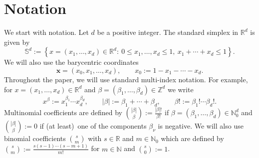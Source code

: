 \documentclass[12pt,reqno]{article}
\begin{document}
\section{Notation}

We start with notation. Let $d$ be a positive integer. The standard simplex
in $\mathbb{R}^{d}$ is given by 
\begin{equation*}
\mathbb{S}^{d}:=\left \{ x=\left( x_{1},\ldots ,x_{d}\right) \in \mathbb{R}%
^{d}:\ 0\leq x_{1},\ldots ,x_{d}\leq 1,\ x_{1}+\cdots +x_{d}\leq 1\right \} .
\end{equation*}%
We will also use the barycentric coordinates 
\begin{equation*}
\mathbf{x}=\left( x_{0},x_{1},\ldots ,x_{d}\right) ,\qquad
x_{0}:=1-x_{1}-\cdots -x_{d}.
\end{equation*}%
Throughout the paper, we will use standard multi-index notation. For
example, for $x=(x_{1},\ldots ,x_{d})\in \mathbb{R}^{d}$ and $\beta =(\beta
_{1},\ldots ,\beta _{d})\in \mathbb{Z}^{d}$ we write 
\begin{equation*}
x^{\beta }:=x_{1}^{\beta _{1}}\cdots x_{d}^{\beta _{d}},\qquad \left \vert
\beta \right \vert :=\beta _{1}+\cdots +\beta _{d},\qquad \beta !:=\beta
_{1}!\cdots \beta _{d}!.
\end{equation*}%
Multinomial coefficients are defined by ${\binom{\left \vert \beta
\right
\vert }{\beta }}:=\frac{|\beta |!}{\beta !}$ if $\beta =(\beta
_{1},\ldots ,\beta _{d})\in \mathbb{N}_{0}^{d}$ and ${\binom{\left \vert
\beta \right
\vert }{\beta }}:=0$ if (at least)\ one of the components $%
\beta _{\nu }$ is negative. We will also use binomial coefficients ${\binom{s%
}{m}}$ with $s\in \mathbb{R}$ and $m\in \mathbb{N}_{0}$ which are defined by 
${\binom{s}{m}}:=\frac{s\left( s-1\right) \cdots \left( s-m+1\right) }{m!}$
for $m\in \mathbb{N}$ and ${\binom{s}{0}}:=1$.
\end{document}

